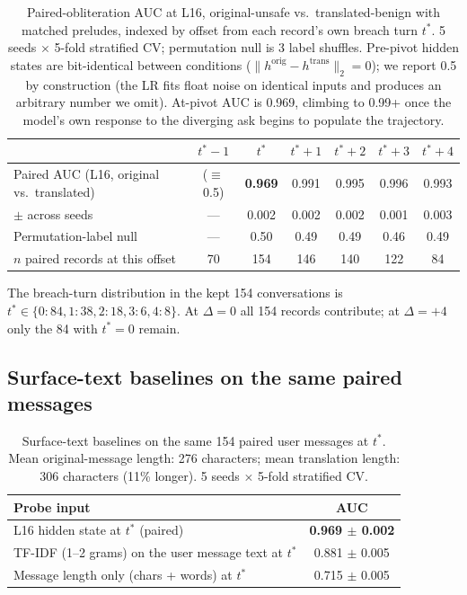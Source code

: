 \documentclass[11pt]{article}
\begin{document}
\begin{table}[h]
\centering
\begin{tabular}{lcccccc}
\toprule
& \textbf{$t^*{-}1$} & \textbf{$t^*$} & \textbf{$t^*{+}1$} & \textbf{$t^*{+}2$} & \textbf{$t^*{+}3$} & \textbf{$t^*{+}4$} \\
\midrule
Paired AUC (L16, original vs.\ translated)   & ($\equiv$0.5) & \textbf{0.969} & 0.991 & 0.995 & 0.996 & 0.993 \\
$\pm$ across seeds                            &  ---           & 0.002          & 0.002 & 0.002 & 0.001 & 0.003 \\
Permutation-label null                        &  ---           & 0.50           & 0.49  & 0.49  & 0.46  & 0.49  \\
$n$ paired records at this offset             & 70             & 154            & 146   & 140   & 122   & 84    \\
\bottomrule
\end{tabular}
\caption{Paired-obliteration AUC at L16, original-unsafe vs.\ translated-benign with matched preludes, indexed by offset from each record's own breach turn $t^*$. 5 seeds $\times$ 5-fold stratified CV; permutation null is 3 label shuffles. Pre-pivot hidden states are bit-identical between conditions ($\|h^{\text{orig}}-h^{\text{trans}}\|_2 = 0$); we report 0.5 by construction (the LR fits float noise on identical inputs and produces an arbitrary number we omit). At-pivot AUC is 0.969, climbing to 0.99+ once the model's own response to the diverging ask begins to populate the trajectory.}
\label{tab:paired_intent}
\end{table}

The breach-turn distribution in the kept 154 conversations is $t^* \in \{0:84, 1:38, 2:18, 3:6, 4:8\}$.
At $\Delta = 0$ all 154 records contribute; at $\Delta = +4$ only the 84 with $t^* = 0$ remain.

\subsection{Surface-text baselines on the same paired messages}

\begin{table}[h]
\centering
\begin{tabular}{lc}
\toprule
\textbf{Probe input} & \textbf{AUC} \\
\midrule
L16 hidden state at $t^*$ (paired)                        & \textbf{0.969 $\pm$ 0.002} \\
TF-IDF (1--2 grams) on the user message text at $t^*$     & 0.881 $\pm$ 0.005 \\
Message length only (chars + words) at $t^*$              & 0.715 $\pm$ 0.005 \\
\bottomrule
\end{tabular}
\caption{Surface-text baselines on the same 154 paired user messages at $t^*$. Mean original-message length: 276 characters; mean translation length: 306 characters (11\% longer). 5 seeds $\times$ 5-fold stratified CV.}
\label{tab:paired_baselines}
\end{table}
\end{document}

